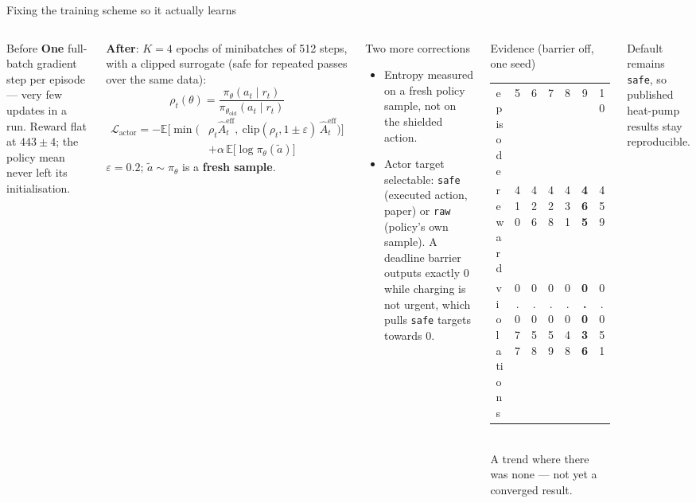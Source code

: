 \documentclass[aspectratio=169,10pt]{beamer}
\begin{document}
\begin{frame}{Fixing the training scheme so it actually learns}
\small
\begin{columns}[T]
\begin{alertblock}{Before}
\textbf{One} full-batch gradient step per episode --- very few updates in a run. Reward flat at $443 \pm 4$; the policy mean never left its initialisation.
\end{alertblock}
\textbf{After}: $K = 4$ epochs of minibatches of 512 steps, with a clipped surrogate (safe for repeated passes over the same data):
\[
\rho_t(\theta) = \frac{\pi_\theta(a_t\mid r_t)}{\pi_{\theta_{\text{old}}}(a_t\mid r_t)}
\]
\begin{align*}
\mathcal L_{\text{actor}} = -\mathbb E\Big[\min\big(&\rho_t \hat A^{\text{eff}}_t,\ \mathrm{clip}(\rho_t, 1\pm\varepsilon)\,\hat A^{\text{eff}}_t\big)\Big]\\
&+ \alpha\,\mathbb E\big[\log \pi_\theta(\tilde a)\big]
\end{align*}
$\varepsilon = 0.2$; $\tilde a \sim \pi_\theta$ is a \textbf{fresh sample}.
\begin{block}{Two more corrections}
\begin{itemize}
  \item Entropy measured on a fresh policy sample, not on the shielded action.
  \item Actor target selectable: \texttt{safe} (executed action, paper) or \texttt{raw} (policy's own sample). A deadline barrier outputs exactly 0 while charging is not urgent, which pulls \texttt{safe} targets towards 0.
\end{itemize}
\end{block}
\begin{exampleblock}{Evidence (barrier off, one seed)}
\scriptsize
\begin{tabular}{@{}lcccccc@{}}
\toprule
episode & 5 & 6 & 7 & 8 & 9 & 10 \\
reward & 410 & 426 & 428 & 431 & \textbf{465} & 459 \\
violations & 0.077 & 0.058 & 0.059 & 0.048 & \textbf{0.036} & 0.051 \\
\bottomrule
\end{tabular}\\[3pt]
A trend where there was none --- not yet a converged result.
\end{exampleblock}
Default remains \texttt{safe}, so published heat-pump results stay reproducible.
\end{columns}
\end{frame}
\end{document}
